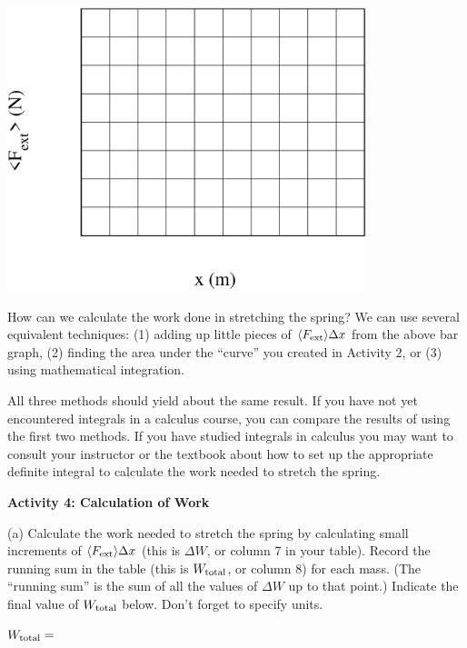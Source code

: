 \vspace{0.3cm}
{\par\centering \includegraphics[height=3.250in]{work_kinetic/workAndKEF2.eps} \par}
\vspace{0.3cm}

How can we calculate the work done in stretching the spring? We can use several
equivalent techniques: (1) adding up little pieces of \( \langle F_{\rm ext} 
\rangle \Delta x \) from the above bar graph,
(2) finding the area under the ``curve'' you created in Activity 2, or (3)
using mathematical integration.

All three methods should yield about the same result. If you have not yet encountered
integrals in a calculus course, you can compare the results of using the first
two methods. If you have studied integrals in calculus you may want to consult
your instructor or the textbook about how to set up the appropriate definite
integral to calculate the work needed to stretch the spring. 

\textbf{Activity 4: Calculation of Work }

(a) Calculate the work needed to stretch the spring by calculating small increments of \( \langle F_{\rm ext} \rangle \Delta  x\) (this is \( \Delta W\), or column 7 in your table). Record the running sum in the table (this is \( W_{\rm total} \), or column 8) for each mass. (The ``running sum'' is the sum of all the values of \( \Delta W\) up to that point.) Indicate the final value of \( W_{\rm total} \) below. Don't forget to specify units.
\vspace{5mm}

\( W_{\rm total} =\) 
\vspace{5mm}

